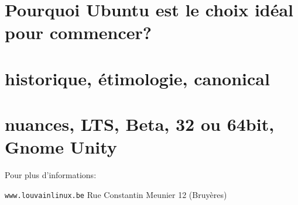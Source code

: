 





\section*{Pourquoi Ubuntu est le choix idéal pour commencer?}



\section*{historique, étimologie, canonical}



\section*{nuances, LTS, Beta, 32 ou 64bit, Gnome Unity}



Pour plus d'informations:

\begin{center}\texttt{www.louvainlinux.be} \hspace{0.5cm}Rue Constantin Meunier 12 (Bruyères)\end{center}
                                                                                                                       
		
